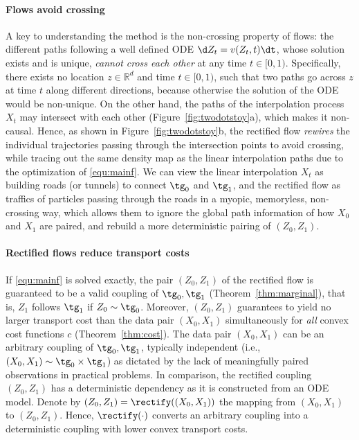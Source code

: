 \documentclass[11pt]{article}
\newcommand{\RR}{\mathbb{R}}
\begin{document}
\paragraph{Flows avoid crossing} %
A key to understanding the method is the non-crossing property of flows: 
the different paths 
following a well defined ODE $\d Z_t = v(Z_t,t) \dt $, 
whose solution exists and is unique, \emph{cannot cross each other} at any time $t\in[0,1)$. 
Specifically,
there exists no location $z\in\RR^d$ and time $t\in[0,1)$, such that two paths go across $z$ at time $t$ along different directions, because otherwise the solution of the ODE would be non-unique. 
On the other hand, the paths of the interpolation process $X_t$ may intersect with each other (Figure~\ref{fig:twodotstoy}a), which makes it non-causal. 
Hence, %
as shown in Figure~\ref{fig:twodotstoy}b,  
the rectified flow 
\emph{rewires} the individual trajectories passing through the intersection points to avoid crossing, while
tracing out the same density map as the linear interpolation paths
due to the optimization of 
\eqref{equ:mainf}.  
We can view the linear interpolation $X_t$ as building
 roads (or tunnels) to connect $\tg_0$ and $\tg_1$, 
 and the rectified flow as traffics of particles passing through the roads in a myopic, memoryless, non-crossing way, 
 which allows them to ignore the global  
 path information of how $X_0$ and $X_1$ are paired, 
 and rebuild a more deterministic pairing of $(Z_0,Z_1)$. 


\paragraph{Rectified flows reduce transport costs} 
If \eqref{equ:mainf} is solved exactly, 
the pair $(Z_0,Z_1)$ 
of the rectified flow 
is guaranteed to be a valid coupling of $\tg_0,\tg_1$ (Theorem~\ref{thm:marginal}), 
that is, $Z_1$ follows $\tg_1$ if $Z_0\sim \tg_0$.  
Moreover, $(Z_0,Z_1)$ guarantees to yield no larger transport cost than the data pair $(X_0,X_1)$ simultaneously for \emph{all} convex cost functions $c$ (Theorem~\ref{thm:cost}). 
The data pair $(X_0,X_1)$ can be an arbitrary coupling of $\tg_0,\tg_1$, typically independent  (i.e., $(X_0,X_1)\sim \tg_0\times \tg_1$)  
as dictated by the lack of meaningfully paired observations in practical problems. %
In comparison, 
the rectified coupling $(Z_0,Z_1)$ has a deterministic dependency as it is constructed from an ODE model. 
Denote by $(Z_0,Z_1)=\rectify((X_0,X_1))$ 
the mapping from $(X_0,X_1)$ to $(Z_0,Z_1)$. 
Hence, %
$\rectify(\cdot)$ converts an arbitrary coupling into a deterministic coupling with lower convex transport costs. 
\end{document}
